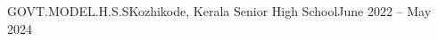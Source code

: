 \resumeSubheading
      {GOVT.MODEL.H.S.S}{Kozhikode, Kerala}
      {Senior High School}{June 2022 -- May 2024}